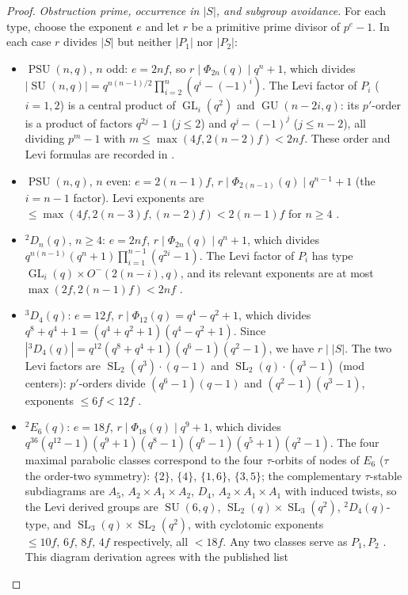 \documentclass[11pt]{amsart}
\theoremstyle{definition}
\theoremstyle{remark}
\DeclareMathOperator{\PSU}{PSU}
\DeclareMathOperator{\SL}{SL}
\DeclareMathOperator{\SU}{SU}
\DeclareMathOperator{\GL}{GL}
\DeclareMathOperator{\GU}{GU}
\begin{document}
\begin{proof}
\emph{Obstruction prime, occurrence in $|S|$, and subgroup avoidance.}
For each type, choose the exponent $e$ and
let $r$ be a primitive prime divisor of $p^{e}-1$. In each case $r$ divides
$|S|$ but neither $|P_1|$ nor $|P_2|$:
\begin{itemize}
\item $\PSU(n,q)$, $n$ odd: $e=2nf$, so $r\mid\Phi_{2n}(q)\mid q^n+1$,
which divides $|\SU(n,q)|=q^{n(n-1)/2}\prod_{i=2}^n(q^i-(-1)^i)$. The
Levi factor of $P_i$ ($i=1,2$) is a central product of $\GL_i(q^2)$ and
$\GU(n-2i,q)$: its $p'$-order is a product of factors $q^{2j}-1$
($j\leq2$) and $q^j-(-1)^j$ ($j\leq n-2$), all dividing $p^m-1$ with
$m\leq\max(4f,2(n-2)f)<2nf$.
These order and Levi formulas are recorded in
\cite[\S2.2, p.~x, and \S3.6, p.~xv]{ATLAS}.
\item $\PSU(n,q)$, $n$ even: $e=2(n-1)f$,
$r\mid\Phi_{2(n-1)}(q)\mid q^{n-1}+1$ (the $i=n-1$ factor). Levi
exponents are $\leq\max(4f,2(n-3)f,(n-2)f)<2(n-1)f$ for $n\geq4$
\cite[\S2.2, p.~x, and \S3.6, p.~xv]{ATLAS}.
\item ${}^2D_n(q)$, $n\geq4$: $e=2nf$, $r\mid\Phi_{2n}(q)\mid q^n+1$,
which divides $q^{n(n-1)}(q^n+1)\prod_{i=1}^{n-1}(q^{2i}-1)$.
The Levi factor of $P_i$ has type
$\GL_i(q)\times O^-(2(n-i),q)$, and its relevant exponents are at most
$\max(2f,2(n-1)f)<2nf$
\cite[\S2.4, p.~xii, and \S3.6, p.~xv]{ATLAS}.
\item ${}^3D_4(q)$: $e=12f$, $r\mid\Phi_{12}(q)=q^4-q^2+1$, which
divides $q^8+q^4+1=(q^4+q^2+1)(q^4-q^2+1)$. Since
$|{}^3D_4(q)|=q^{12}(q^8+q^4+1)(q^6-1)(q^2-1)$, we have
$r\mid|S|$. The two Levi factors
are $\SL_2(q^3)\cdot(q-1)$ and $\SL_2(q)\cdot(q^3-1)$ (mod centers):
$p'$-orders divide $(q^6-1)(q-1)$ and $(q^2-1)(q^3-1)$, exponents
$\leq6f<12f$ \cite[Table~6, p.~xvi, and \S3.6, p.~xv]{ATLAS}.
\item ${}^2E_6(q)$: $e=18f$, $r\mid\Phi_{18}(q)\mid q^9+1$, which
divides $q^{36}(q^{12}-1)(q^9+1)(q^8-1)(q^6-1)(q^5+1)(q^2-1)$. The four
maximal parabolic classes correspond to the four $\tau$-orbits of nodes
of $E_6$ ($\tau$ the order-two symmetry): $\{2\}$, $\{4\}$, $\{1,6\}$,
$\{3,5\}$; the complementary $\tau$-stable subdiagrams are $A_5$,
$A_2{\times}A_1{\times}A_2$, $D_4$, $A_2{\times}A_1{\times}A_1$ with induced
twists, so the Levi derived groups are $\SU(6,q)$,
$\SL_2(q){\times}\SL_3(q^2)$, ${}^2D_4(q)$-type, and
$\SL_3(q){\times}\SL_2(q^2)$, with cyclotomic exponents
$\leq10f,\,6f,\,8f,\,4f$ respectively, all $<18f$. Any two classes
serve as $P_1,P_2$ \cite[Table~6, p.~xvi, and \S3.6, p.~xv]{ATLAS}.
This diagram derivation agrees with the published list

\end{itemize}
\end{proof}
\end{document}
